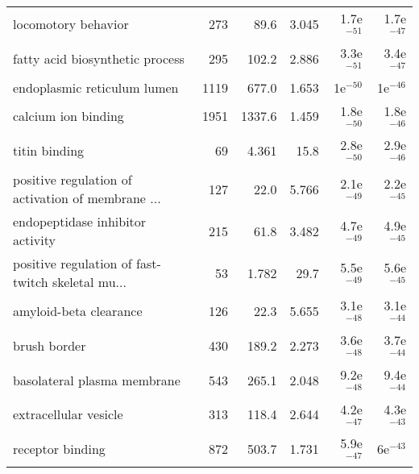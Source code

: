 \begin{longtable}{lrrrrr}
                               locomotory behavior &                     273 &                    89.6 &      3.045 &         1.7e$^{-51}$ &         1.7e$^{-47}$ \\
                   fatty acid biosynthetic process &                     295 &                   102.2 &      2.886 &         3.3e$^{-51}$ &         3.4e$^{-47}$ \\
                       endoplasmic reticulum lumen &                    1119 &                   677.0 &      1.653 &           1e$^{-50}$ &           1e$^{-46}$ \\
                               calcium ion binding &                    1951 &                  1337.6 &      1.459 &         1.8e$^{-50}$ &         1.8e$^{-46}$ \\
                                     titin binding &                      69 &                   4.361 &       15.8 &         2.8e$^{-50}$ &         2.9e$^{-46}$ \\
 positive regulation of activation of membrane ... &                     127 &                    22.0 &      5.766 &         2.1e$^{-49}$ &         2.2e$^{-45}$ \\
                  endopeptidase inhibitor activity &                     215 &                    61.8 &      3.482 &         4.7e$^{-49}$ &         4.9e$^{-45}$ \\
 positive regulation of fast-twitch skeletal mu... &                      53 &                   1.782 &       29.7 &         5.5e$^{-49}$ &         5.6e$^{-45}$ \\
                            amyloid-beta clearance &                     126 &                    22.3 &      5.655 &         3.1e$^{-48}$ &         3.1e$^{-44}$ \\
                                      brush border &                     430 &                   189.2 &      2.273 &         3.6e$^{-48}$ &         3.7e$^{-44}$ \\
                       basolateral plasma membrane &                     543 &                   265.1 &      2.048 &         9.2e$^{-48}$ &         9.4e$^{-44}$ \\
                             extracellular vesicle &                     313 &                   118.4 &      2.644 &         4.2e$^{-47}$ &         4.3e$^{-43}$ \\
                                  receptor binding &                     872 &                   503.7 &      1.731 &         5.9e$^{-47}$ &           6e$^{-43}$ \\

\end{longtable}

